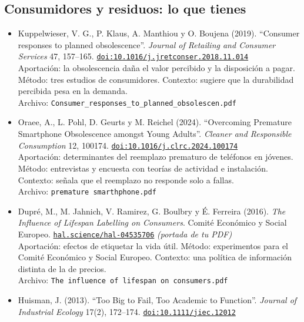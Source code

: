 \documentclass[11pt]{article}
\begin{document}
\subsection*{Consumidores y residuos: lo que tienes}
\begin{itemize}
\item Kuppelwieser, V. G., P. Klaus, A. Manthiou y O. Boujena (2019). ``Consumer responses to planned obsolescence''. \textit{Journal of Retailing and Consumer Services} 47, 157--165. \href{https://doi.org/10.1016/j.jretconser.2018.11.014}{\texttt{doi:10.1016/j.jretconser.2018.11.014}}\\
Aportación: la obsolescencia daña el valor percibido y la disposición a pagar. Método: tres estudios de consumidores. Contexto: sugiere que la durabilidad percibida pesa en la demanda.\\
{\footnotesize Archivo: \texttt{Consumer\_responses\_to\_planned\_obsolescen.pdf}}
\item Oraee, A., L. Pohl, D. Geurts y M. Reichel (2024). ``Overcoming Premature Smartphone Obsolescence amongst Young Adults''. \textit{Cleaner and Responsible Consumption} 12, 100174. \href{https://doi.org/10.1016/j.clrc.2024.100174}{\texttt{doi:10.1016/j.clrc.2024.100174}}\\
Aportación: determinantes del reemplazo prematuro de teléfonos en jóvenes. Método: entrevistas y encuesta con teorías de actividad e instalación. Contexto: señala que el reemplazo no responde solo a fallas.\\
{\footnotesize Archivo: \texttt{premature smarthphone.pdf}}
\item Dupré, M., M. Jahnich, V. Ramirez, G. Boulbry y É. Ferreira (2016). \textit{The Influence of Lifespan Labelling on Consumers}. Comité Económico y Social Europeo. \href{https://hal.science/hal-04535706}{\texttt{hal.science/hal-04535706}} \textit{(portada de tu PDF)}\\
Aportación: efectos de etiquetar la vida útil. Método: experimentos para el Comité Económico y Social Europeo. Contexto: una política de información distinta de la de precios.\\
{\footnotesize Archivo: \texttt{The influence of lifespan on consumers.pdf}}
\item Huisman, J. (2013). ``Too Big to Fail, Too Academic to Function''. \textit{Journal of Industrial Ecology} 17(2), 172--174. \href{https://doi.org/10.1111/jiec.12012}{\texttt{doi:10.1111/jiec.12012}}\\

\end{itemize}
\end{document}
